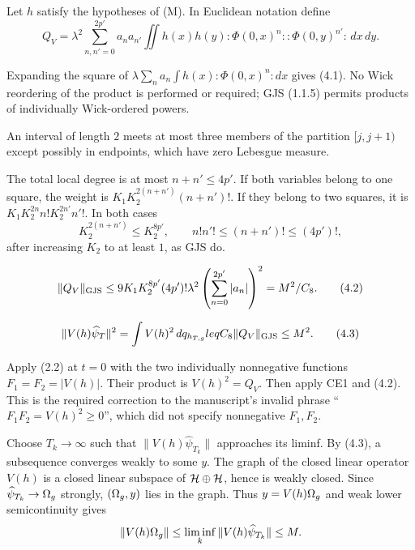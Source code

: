 \documentclass[11pt,a4paper]{article}
\begin{document}
Let $h$ satisfy the hypotheses of (M).  In Euclidean notation define
\[
 Q_V=\lambda^2\sum_{n,n'=0}^{2p'}a_na_{n'}
 \iint h(x)h(y){:}\Phi(0,x)^n{:}{:}\Phi(0,y)^{n'}{:}\,dx\,dy.       \tag{4.1}
\]


\Because Expanding the square of
$\lambda\sum_na_n\int h(x){:}\Phi(0,x)^n{:}dx$ gives (4.1).  No Wick
reordering of the product is performed or required; GJS (1.1.5) permits products
of individually Wick-ordered powers.


\Because An interval of length $2$ meets at most three members of the partition
$[j,j+1)$ except possibly in endpoints, which have zero Lebesgue measure.


\Because The total local degree is at most $n+n'\leq4p'$.  If both variables
belong to one square, the weight is
$K_1K_2^{2(n+n')}(n+n')!$.  If they belong to two squares, it is
$K_1K_2^{2n}n!K_2^{2n'}n'!$.  In both cases
\[
 K_2^{2(n+n')}\leq K_2^{8p'},\qquad n!n'!\leq(n+n')!\leq(4p')!,
\]
after increasing $K_2$ to at least $1$, as GJS do.

\[
 \|Q_V\|_{\rm GJS}\leq
 9K_1K_2^{8p'}(4p')!\lambda^2
 \left(\sum_{n=0}^{2p'}|a_n|\right)^2=M^2/C_8.                     \tag{4.2}
\]

\[
 \|V(h)\widehat\psi_T\|^2
 =\int V(h)^2\,dq_{h_{T,g}}leq C_8\|Q_V\|_{\rm GJS}\leq M^2.     \tag{4.3}
\]

\Because Apply (2.2) at $t=0$ with the two individually nonnegative functions
$F_1=F_2=|V(h)|$.  Their product is $V(h)^2=Q_V$.  Then apply CE1 and (4.2).
This is the required correction to the manuscript's invalid phrase
``$F_1F_2=V(h)^2\geq0$'', which did not specify nonnegative $F_1,F_2$.


\Because Choose $T_k\to\infty$ such that
$\|V(h)\widehat\psi_{T_k}\|$ approaches its liminf.  By (4.3), a subsequence
converges weakly to some $y$.  The graph of the closed linear operator $V(h)$ is a
closed linear subspace of $\mathcal H\oplus\mathcal H$, hence is weakly closed.  Since
$\widehat\psi_{T_k}\to\Omega_g$ strongly, $(\Omega_g,y)$ lies in the graph.  Thus
$y=V(h)\Omega_g$ and weak lower semicontinuity gives
\[
 \|V(h)\Omega_g\|\leq\liminf_k\|V(h)\widehat\psi_{T_k}\|\leq M.
\]
\end{document}

